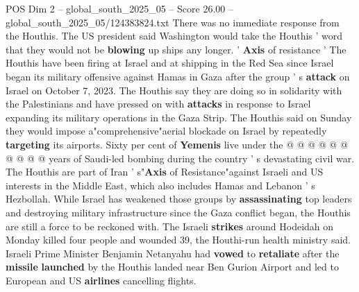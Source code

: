 \begin{textsample}{POS Dim 2 – global\_south\_2025\_05 – Score 26.00 – global\_south\_2025\_05/124383824.txt}
There was no immediate response from the Houthis.
The US president said Washington would take the Houthis ' word that they would not be \textbf{blowing} up ships any longer. ' \textbf{Axis} of resistance ' The Houthis have been firing at Israel and at shipping in the Red Sea since Israel began its military offensive against Hamas in Gaza after the group ' s \textbf{attack} on Israel on October 7, 2023.
The Houthis say they are doing so in solidarity with the Palestinians and have pressed on with \textbf{attacks} in response to Israel expanding its military operations in the Gaza Strip.
The Houthis said on Sunday they would impose a"comprehensive"aerial blockade on Israel by repeatedly \textbf{targeting} its airports.
Sixty per cent of \textbf{Yemenis} live under the @ @ @ @ @ @ @ @ @ @ years of Saudi-led bombing during the country ' s devastating civil war.
The Houthis are part of Iran ' s"\textbf{Axis} of Resistance"against Israeli and US interests in the Middle East, which also includes Hamas and Lebanon ' s Hezbollah.
While Israel has weakened those groups by \textbf{assassinating} top leaders and destroying military infrastructure since the Gaza conflict began, the Houthis are still a force to be reckoned with.
The Israeli \textbf{strikes} around Hodeidah on Monday killed four people and wounded 39, the Houthi-run health ministry said.
Israeli Prime Minister Benjamin Netanyahu had \textbf{vowed} to \textbf{retaliate} after the \textbf{missile} \textbf{launched} by the Houthis landed near Ben Gurion Airport and led to European and US \textbf{airlines} cancelling flights.

\end{textsample}
